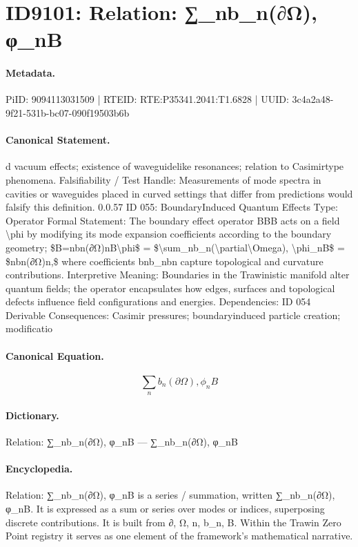 \section*{ID9101: Relation: ∑\_nb\_n(∂Ω), φ\_nB}
\paragraph{Metadata.}
PiID: 9094113031509 | RTEID: RTE:P35341.2041:T1.6828 | UUID: 3c4a2a48-9f21-531b-bc07-090f19503b6b

\paragraph{Canonical Statement.}
d vacuum effects; existence of waveguidelike resonances; relation to Casimirtype phenomena. Falsifiability / Test Handle: Measurements of mode spectra in cavities or waveguides placed in curved settings that differ from predictions would falsify this definition. 0.0.57 ID 055: BoundaryInduced Quantum Effects Type: Operator Formal Statement: The boundary effect operator BBB acts on a field \textbackslash{}phi by modifying its mode expansion coefficients according to the boundary geometry; \$B=nbn(∂Ω)nB\textbackslash{}phi\$ = \$\textbackslash{}sum\_nb\_n(\textbackslash{}partial\textbackslash{}Omega), \textbackslash{}phi\_nB\$ = \$nbn(∂Ω)n,\$ where coefficients bnb\_nbn capture topological and curvature contributions. Interpretive Meaning: Boundaries in the Trawinistic manifold alter quantum fields; the operator encapsulates how edges, surfaces and topological defects influence field configurations and energies. Dependencies: ID 054 Derivable Consequences: Casimir pressures; boundaryinduced particle creation; modificatio

\paragraph{Canonical Equation.}
\[
\sum_nb_n(\partial\Omega), \phi_nB
\]

\paragraph{Dictionary.}
Relation: ∑\_nb\_n(∂Ω), φ\_nB — ∑\_nb\_n(∂Ω), φ\_nB

\paragraph{Encyclopedia.}
Relation: ∑\_nb\_n(∂Ω), φ\_nB is a series / summation, written ∑\_nb\_n(∂Ω), φ\_nB. It is expressed as a sum or series over modes or indices, superposing discrete contributions. It is built from ∂, Ω, n, b\_n, B. Within the Trawin Zero Point registry it serves as one element of the framework's mathematical narrative.
